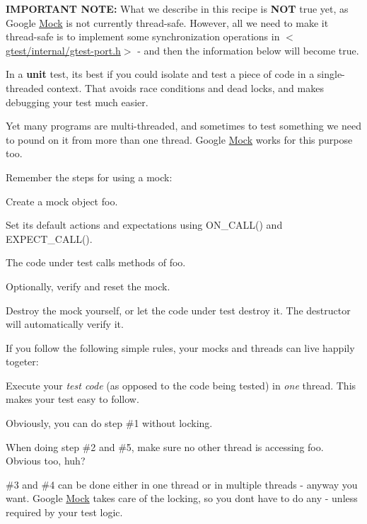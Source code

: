 {\bfseries I\+M\+P\+O\+R\+T\+A\+NT N\+O\+TE\+:} What we describe in this recipe is {\bfseries N\+OT} true yet, as Google \hyperlink{class_mock}{Mock} is not currently thread-\/safe. However, all we need to make it thread-\/safe is to implement some synchronization operations in {\ttfamily $<$\hyperlink{gtest-port_8h_source}{gtest/internal/gtest-\/port.\+h}$>$} -\/ and then the information below will become true.

In a {\bfseries unit} test, it\textquotesingle{}s best if you could isolate and test a piece of code in a single-\/threaded context. That avoids race conditions and dead locks, and makes debugging your test much easier.

Yet many programs are multi-\/threaded, and sometimes to test something we need to pound on it from more than one thread. Google \hyperlink{class_mock}{Mock} works for this purpose too.

Remember the steps for using a mock\+:


\begin{DoxyEnumerate}
\item Create a mock object {\ttfamily foo}.
\end{DoxyEnumerate}
\begin{DoxyEnumerate}
\item Set its default actions and expectations using {\ttfamily O\+N\+\_\+\+C\+A\+L\+L()} and {\ttfamily E\+X\+P\+E\+C\+T\+\_\+\+C\+A\+L\+L()}.
\end{DoxyEnumerate}
\begin{DoxyEnumerate}
\item The code under test calls methods of {\ttfamily foo}.
\end{DoxyEnumerate}
\begin{DoxyEnumerate}
\item Optionally, verify and reset the mock.
\end{DoxyEnumerate}
\begin{DoxyEnumerate}
\item Destroy the mock yourself, or let the code under test destroy it. The destructor will automatically verify it.
\end{DoxyEnumerate}

If you follow the following simple rules, your mocks and threads can live happily togeter\+:


\begin{DoxyItemize}
\item Execute your {\itshape test code} (as opposed to the code being tested) in {\itshape one} thread. This makes your test easy to follow.
\item Obviously, you can do step \#1 without locking.
\item When doing step \#2 and \#5, make sure no other thread is accessing {\ttfamily foo}. Obvious too, huh?
\item \#3 and \#4 can be done either in one thread or in multiple threads -\/ anyway you want. Google \hyperlink{class_mock}{Mock} takes care of the locking, so you don\textquotesingle{}t have to do any -\/ unless required by your test logic.
\end{DoxyItemize}

